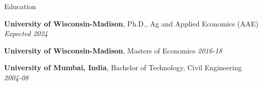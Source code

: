 \documentclass{resume} %
\begin{document}

\begin{rSection}{Education}

{\bf University of Wisconsin-Madison}, Ph.D., Ag and Applied Economics (AAE) \hfill {\em Expected 2024} 


{\bf University of Wisconsin-Madison}, Masters of Economics \hfill {\em 2016-18}

{\bf University of Mumbai, India}, Bachelor of Technology, Civil Engineering \hfill {\em 2004-08}

\end{rSection}


	
\end{document}
